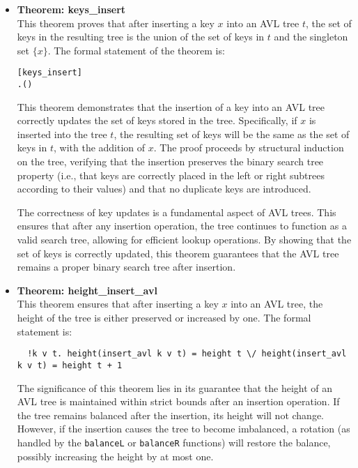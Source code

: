 \documentclass[12pt]{article}
\begin{document}
\begin{itemize}

  \item \textbf{Theorem: keys\_insert} \\
  This theorem proves that after inserting a key \( x \) into an AVL tree \( t \), the set of keys in the resulting tree is the union of the set of keys in \( t \) and the singleton set \( \{x\} \). The formal statement of the theorem is:

\begin{alltt}
[keys_insert]
\HOLTokenTurnstile{} \HOLSymConst{\HOLTokenForall{}}  .  (   ) \HOLSymConst{=}   \HOLSymConst{\HOLTokenUnion{}} \HOLTokenLeftbrace{}\HOLTokenRightbrace{}
\end{alltt}

  This theorem demonstrates that the insertion of a key into an AVL tree correctly updates the set of keys stored in the tree. Specifically, if \( x \) is inserted into the tree \( t \), the resulting set of keys will be the same as the set of keys in \( t \), with the addition of \( x \). The proof proceeds by structural induction on the tree, verifying that the insertion preserves the binary search tree property (i.e., that keys are correctly placed in the left or right subtrees according to their values) and that no duplicate keys are introduced.

  The correctness of key updates is a fundamental aspect of AVL trees. This ensures that after any insertion operation, the tree continues to function as a valid search tree, allowing for efficient lookup operations. By showing that the set of keys is correctly updated, this theorem guarantees that the AVL tree remains a proper binary search tree after insertion.

  \item \textbf{Theorem: height\_insert\_avl} \\
  This theorem ensures that after inserting a key \( x \) into an AVL tree, the height of the tree is either preserved or increased by one. The formal statement is:
  \begin{verbatim}
  !k v t. height(insert_avl k v t) = height t \/ height(insert_avl k v t) = height t + 1
  \end{verbatim}
  The significance of this theorem lies in its guarantee that the height of an AVL tree is maintained within strict bounds after an insertion operation. If the tree remains balanced after the insertion, its height will not change. However, if the insertion causes the tree to become imbalanced, a rotation (as handled by the \texttt{balanceL} or \texttt{balanceR} functions) will restore the balance, possibly increasing the height by at most one.


\end{itemize}
\end{document}
